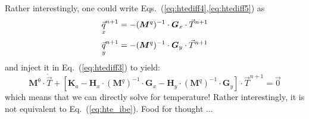 Rather interestingly, one could write Eqs.~(\ref{eq:htediff4},\ref{eq:htediff5}) 
as
\[
\vec{\underset{\tiny x}{q}}^{n+1} = - ({\bm M}^q)^{-1} \cdot {\bm G}_x \cdot \vec{T}^{n+1}
\]
\[
\vec{\underset{\tiny y}{q}}^{n+1} = - ({\bm M}^q)^{-1} \cdot {\bm G}_y \cdot \vec{T}^{n+1}
\]
and inject it in Eq.~(\ref{eq:htediff3}) to yield:
\begin{equation}
{\bm M}^\uptheta \cdot \dot{\vec{T}} + [ {\bm K}_a 
- {\bm H}_x \cdot ({\bm M}^q)^{-1} \cdot {\bm G}_x 
- {\bm H}_y \cdot ({\bm M}^q)^{-1} \cdot {\bm G}_y ] \cdot \vec{T}^{n+1}
=\vec{0} 
\end{equation}
which means that we can directly solve for temperature! 
Rather interestingly, it is not equivalent to 
Eq.~(\ref{eq:hte_ibe}). Food for thought ...

























